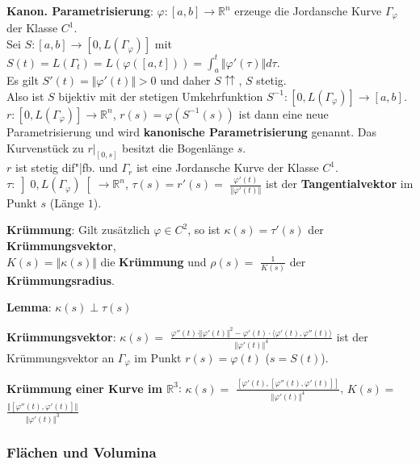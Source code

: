 \textbf{Kanon. Parametrisierung}:
$\varphi: [a,b] \rightarrow \mathbb{R}^n$ erzeuge die
Jordansche Kurve $\Gamma_\varphi$ der Klasse $C^1$. \\
Sei $S: [a,b] \rightarrow [0, L(\Gamma_\varphi)]$ mit
$S(t) = L(\Gamma_t) = L(\varphi([a,t])) =
\int_a^t \Vert \varphi'(\tau) \Vert d \tau$. \\
Es gilt $S'(t) = \Vert \varphi'(t) \Vert > 0$ und daher
$S\!\!\upuparrows$, $S$ stetig. \\
Also ist $S$ bijektiv mit der stetigen Umkehrfunktion
$S^{-1}: [0, L(\Gamma_\varphi)] \rightarrow [a,b]$. \\
$r: [0, L(\Gamma_\varphi)] \rightarrow \mathbb{R}^n$,
$r(s) = \varphi(S^{-1}(s))$ ist dann eine neue Parametrisierung und wird
\textbf{kanonische Parametrisierung} genannt.
Das Kurvenstück zu $r|_{[0,s]}$ besitzt die Bogenlänge $s$. \\
$r$ ist stetig dif"|fb. und $\Gamma_r$ ist eine Jordansche Kurve der Klasse
$C^1$. \\
$\tau: \left]0, L(\Gamma_\varphi)\right[ \rightarrow \mathbb{R}^n$,
$\tau(s) = r'(s) =$ {\large $\frac{\varphi'(t)}{\Vert \varphi'(t) \Vert}$}
ist der \textbf{Tangentialvektor} im Punkt $s$ (Länge $1$).

\linie

\textbf{Krümmung}: Gilt zusätzlich $\varphi \in C^2$, so ist
$\kappa(s) = \tau'(s)$ der \textbf{Krümmungsvektor}, \\
$K(s) = \Vert \kappa(s) \Vert$ die \textbf{Krümmung} und
$\rho(s) =$ {\large $\frac{1}{K(s)}$} der \textbf{Krümmungsradius}.

\textbf{Lemma}: $\kappa(s) \;\bot\; \tau(s)$

\pagebreak

\textbf{Krümmungsvektor}:
$\kappa(s) =$ {\large $\frac{\varphi''(t) \cdot \Vert \varphi'(t) \Vert^2 -
\varphi'(t) \cdot \langle \varphi'(t), \varphi''(t) \rangle}
{\Vert \varphi'(t) \Vert^4}$} ist der Krümmungsvektor an $\Gamma_\varphi$
im Punkt $r(s) = \varphi(t)$ ($s = S(t)$).

\textbf{Krümmung einer Kurve im $\mathbb{R}^3$}:
$\kappa(s) =$ {\large $\frac{[\varphi'(t), [\varphi''(t), \varphi'(t)]]}
{\Vert \varphi'(t) \Vert^4}$}, \quad
$K(s) =$ {\large $\frac{\Vert [\varphi''(t), \varphi'(t)] \Vert}
{\Vert \varphi'(t) \Vert^3}$}

\subsubsection{%
    Flächen und Volumina%
}

